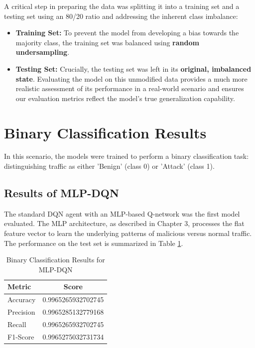 \documentclass[16pt]{report}
\begin{document}
A critical step in preparing the data was splitting it into a training set and a testing set using an 80/20 ratio and addressing the inherent class imbalance:
\begin{itemize}
    \item \textbf{Training Set:} To prevent the model from developing a bias towards the majority class, the training set was balanced using \textbf{random undersampling}.
    \item \textbf{Testing Set:} Crucially, the testing set was left in its \textbf{original, imbalanced state}. Evaluating the model on this unmodified data provides a much more realistic assessment of its performance in a real-world scenario and ensures our evaluation metrics reflect the model's true generalization capability.
\end{itemize}\section{Binary Classification Results}
In this scenario, the models were trained to perform a binary classification task: distinguishing traffic as either 'Benign' (class 0) or 'Attack' (class 1).

\subsection{Results of MLP-DQN}
The standard DQN agent with an MLP-based Q-network was the first model evaluated. The MLP architecture, as described in Chapter 3, processes the flat feature vector to learn the underlying patterns of malicious versus normal traffic. The performance on the test set is summarized in Table \ref{tab:binary_dqn_results}.

\begin{table}[H]
    \centering
    \caption{Binary Classification Results for MLP-DQN}
    \label{tab:binary_dqn_results}
    \begin{tabular}{@{}lc@{}}
        \toprule
        \textbf{Metric} & \textbf{Score} \\
        \midrule
        Accuracy & 0.9965265932702745 \\
        Precision & 0.9965285132779168 \\
        Recall & 0.9965265932702745 \\
        F1-Score & 0.9965275032731734 \\
        \bottomrule
    \end{tabular}
\end{table}
\end{document}
